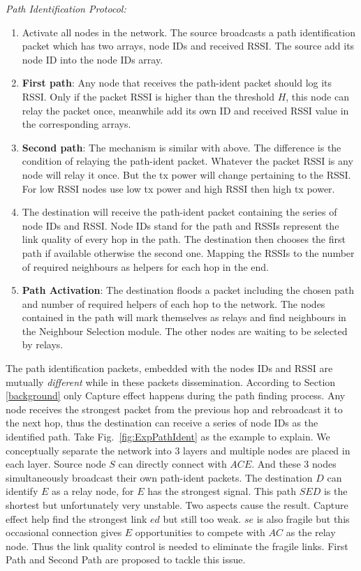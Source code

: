 \documentclass[conference]{IEEEtran}
\begin{document}
\emph{Path Identification Protocol:}
\begin{enumerate}
 \item Activate all nodes in the network. The source broadcasts a path identification packet which has two arrays, node IDs and received RSSI. The source add its node ID into the node IDs array. %
 \item \textbf{First path}: Any node that receives the path-ident packet should log its RSSI. Only if the packet RSSI is higher than the threshold $H$, this node can relay the packet once, meanwhile add its own ID and received RSSI value in the corresponding arrays.
 \item \textbf{Second path}: The mechanism is similar with above. The difference is the condition of relaying the path-ident packet. Whatever the packet RSSI is any node will relay it once. But the tx power will change pertaining to the RSSI. For low RSSI nodes use low tx power and high RSSI then high tx power.
  \item The destination will receive the path-ident packet containing the series of node IDs and RSSI. Node IDs stand for the path and RSSIs represent the link quality of every hop in the path. The destination then chooses the first path if available otherwise the second one. Mapping the RSSIs to the number of required neighbours as helpers for each hop in the end.%
  \item \textbf{Path Activation}: The destination floods a packet including the chosen path and number of required helpers of each hop to the network. The nodes contained in the path will mark themselves as relays and find neighbours in the Neighbour Selection module. The other nodes are waiting to be selected by relays.
 \end{enumerate}

The path identification packets, embedded with the nodes IDs and RSSI are mutually \emph{different} while in these packets dissemination. According to Section \ref{background} only Capture effect happens during the path finding process. Any node receives the strongest packet from the previous hop and rebroadcast it to the next hop, thus the destination can receive a series of node IDs as the identified path. Take Fig.~\ref{fig:ExpPathIdent} as the example to explain. We conceptually separate the network into 3 layers and multiple nodes are placed in each layer. Source node $S$ can directly connect with $A C E$. And these 3 nodes simultaneously broadcast their own path-ident packets. The destination $D$ can identify $E$ as a relay node, for $E$ has the strongest signal. This path $SED$ is the shortest but unfortunately very unstable. Two aspects cause the result. Capture effect help find the strongest link $ed$ but still too weak. $se$ is also fragile but this occasional connection gives $E$ opportunities to compete with $AC$ as the relay node. Thus the link quality control is needed to eliminate the fragile links. First Path and Second Path are proposed to tackle this issue.
\end{document}

